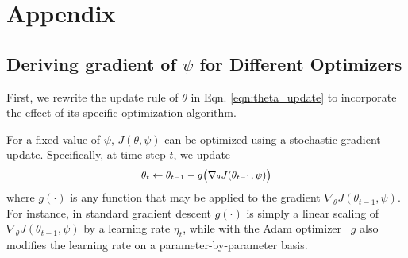 \section{\label{app} Appendix}

\subsection{\label{app:grad_of_optimizers}Deriving gradient of $\psi$ for Different Optimizers}
First, we rewrite the update rule of $\theta$ in  Eqn. \ref{eqn:theta_update} to incorporate the effect of its specific optimization algorithm.

For a fixed value of $\psi$, $J(\theta, \psi)$ can be optimized using a stochastic gradient update. Specifically, at time step $t$, we update
\begin{equation}
  \label{eqn:theta_update_rule}
   \small
  \begin{aligned}
    \theta_t \leftarrow \theta_{t-1} - g\big( \nabla_\theta J(\theta_{t-1}, \psi) \big)
  \end{aligned}
\end{equation}
where $g(\cdot)$ is any function that may be applied to the gradient $\nabla_\theta J(\theta_{t-1}, \psi)$. For instance, in standard gradient descent $g(\cdot)$ is simply a linear scaling of $\nabla_\theta J(\theta_{t-1}, \psi)$ by a learning rate $\eta_t$, while with the Adam optimizer~\citep{adam} $g$ also modifies the learning rate on a parameter-by-parameter basis.

